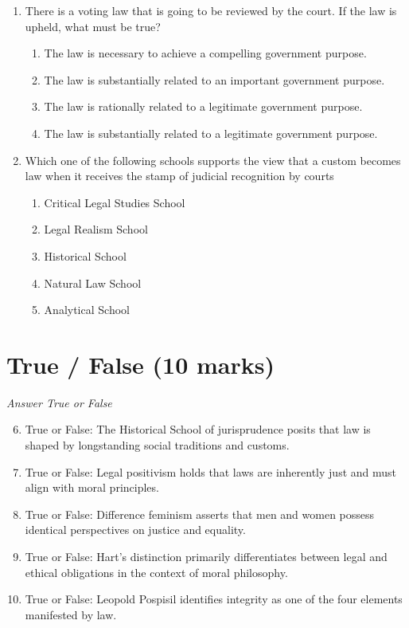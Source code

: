 \documentclass[12pt]{article}
\begin{document}
\begin{enumerate}[label=\arabic*.]
\begin{enumerate}[label=(\alph*)]
\end{enumerate}
\item There is a voting law that is going to be reviewed by the court. If the law is upheld, what must be true?
\begin{enumerate}[label=(\alph*)]
    \item The law is necessary to achieve a compelling government purpose.
    \item The law is substantially related to an important government purpose.
    \item The law is rationally related to a legitimate government purpose.
    \item The law is substantially related to a legitimate government purpose.
\end{enumerate}
\item Which one of the following schools supports the view that a custom becomes law when it receives the stamp of judicial recognition by courts
\begin{enumerate}[label=(\alph*)]
    \item Critical Legal Studies School
    \item Legal Realism School
    \item Historical School
    \item Natural Law School
    \item Analytical School
\end{enumerate}
\end{enumerate}

\section*{True / False (10 marks)}
\textit{Answer True or False}
\begin{enumerate}[label=\arabic*.]
\setcounter{enumi}{5}
\item True or False: The Historical School of jurisprudence posits that law is shaped by longstanding social traditions and customs.
\item True or False: Legal positivism holds that laws are inherently just and must align with moral principles.
\item True or False: Difference feminism asserts that men and women possess identical perspectives on justice and equality.
\item True or False: Hart's distinction primarily differentiates between legal and ethical obligations in the context of moral philosophy.
\item True or False: Leopold Pospisil identifies integrity as one of the four elements manifested by law.
\end{enumerate}
\end{document}
